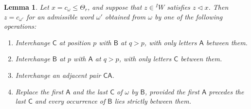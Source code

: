 \documentclass[11pt,a4paper,reqno]{amsart}
\numberwithin{equation}{section}
\newtheorem{lemma}[theorem]{Lemma}
\theoremstyle{definition}
\theoremstyle{remark}
\theoremstyle{plain}
\newcommand{\A}{\mathsf A}
\newcommand{\B}{\mathsf B}
\newcommand{\CC}{\mathsf C}
\begin{document}
\begin{lemma}\label{lem:word-covers}
Let $x=c_\omega\leq\Theta_r$, and suppose that
$z\in{}^I W$ satisfies $z\triangleleft x$.
Then $z=c_{\omega'}$ for an admissible word $\omega'$ obtained from
$\omega$ by one of the following operations:
\begin{enumerate}[label=\textup{(\roman*)}]
\item Interchange $\CC$ at position $p$ with $\B$ at $q>p$,
with only letters $\A$ between them.
\item Interchange $\B$ at $p$ with $\A$ at $q>p$,
with only letters $\CC$ between them.
\item Interchange an adjacent pair $\CC\A$.
\item Replace the first $\A$ and the last $\CC$ of $\omega$ by $\B$,
provided the first $\A$ precedes the last $\CC$ and every occurrence
of $\B$ lies strictly between them.
\end{enumerate}
\end{lemma}
\end{document}

